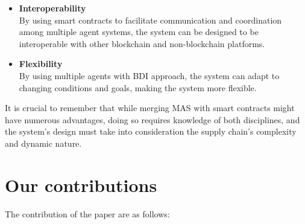 \begin{itemize}
\vspace{.5cm}

\item \textbf{Interoperability} \\ By using smart contracts to facilitate communication and coordination among multiple agent systems, the system can be designed to be interoperable with other blockchain and non-blockchain platforms.

\vspace{.5cm}

\item \textbf{Flexibility} \\ By using multiple agents with \ac{BDI} approach, the system can adapt to changing conditions and goals, making the system more flexible.
\end{itemize}

It is crucial to remember that while merging \ac{MAS} with smart contracts might have numerous advantages, doing so requires knowledge of both disciplines, and the system's design must take into consideration the supply chain's complexity and dynamic nature.

\section{Our contributions}

The contribution of the paper are as follows:


